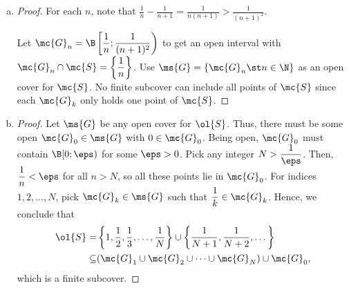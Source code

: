 \begin{enumerate}[(a)]
	\item 
	\begin{proof}
		For each \(n\), note that \(\displaystyle\frac{1}{n}-\frac{1}{n+1}=\frac{1}{n(n+1)}>\frac{1}{(n+1)^2}\).
		
		\smallskip
		
		Let \(\mc{G}_n=\B\left[\displaystyle\frac{1}{n};\frac{1}{(n+1)^2}\right)\) to get an open interval with \(\mc{G}_n\cap\mc{S}=\left\{\displaystyle\frac{1}{n}\right\}\). Use \(\ms{G}=\{\mc{G}_n\st n\in\N\}\) as an open cover for \(\mc{S}\). No finite subcover can include all points of \(\mc{S}\) since each \(\mc{G}_k\) only holds one point of \(\mc{S}\).
	\end{proof}
	
	\item 
	\begin{proof}
		Let \(\ms{G}\) be any open cover for \(\ol{S}\). Thus, there must be some open \(\mc{G}_0\in\ms{G}\) with \(0\in\mc{G}_0\). Being open, \(\mc{G}_0\) must contain \(\B[0;\eps)\) for some \(\eps>0\). Pick any integer \(N>\displaystyle\frac{1}{\eps}\). Then, \(\displaystyle\frac{1}{n}<\eps\) for all \(n>N\), so all these points lie in \(\mc{G}_0\). For indices \(1,2,\dots,N\), pick \(\mc{G}_k\in\ms{G}\) such that \(\displaystyle\frac{1}{k}\in\mc{G}_k\). Hence, we conclude that 
		\begin{align*}
			\ol{S}=&\left\{1,\frac{1}{2},\frac{1}{3},\dots,\frac{1}{N}\right\}\cup\left\{\frac{1}{N+1},\frac{1}{N+2},\dots\right\}\\
			\subseteq&(\mc{G}_1\cup\mc{G}_2\cup\dots\cup\mc{G}_N)\cup\mc{G}_0,
		\end{align*}
		which is a finite subcover.
	\end{proof}
\end{enumerate}

